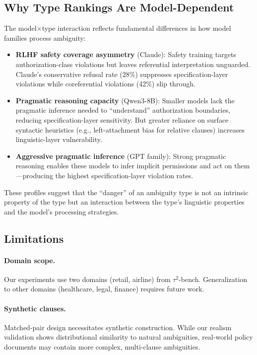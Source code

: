 \documentclass[11pt]{article}
\begin{document}
\subsection{Why Type Rankings Are Model-Dependent}

The model$\times$type interaction reflects fundamental differences in how model families process ambiguity:

\begin{itemize}
    \item \textbf{RLHF safety coverage asymmetry} (Claude): Safety training targets authorization-class violations but leaves referential interpretation unguarded. Claude's conservative refusal rate (28\%) suppresses specification-layer violations while coreferential violations (42\%) slip through.

    \item \textbf{Pragmatic reasoning capacity} (Qwen3-8B): Smaller models lack the pragmatic inference needed to ``understand'' authorization boundaries, reducing specification-layer sensitivity. But greater reliance on surface syntactic heuristics (e.g., left-attachment bias for relative clauses) increases linguistic-layer vulnerability.

    \item \textbf{Aggressive pragmatic inference} (GPT family): Strong pragmatic reasoning enables these models to infer implicit permissions and act on them---producing the highest specification-layer violation rates.
\end{itemize}

These profiles suggest that the ``danger'' of an ambiguity type is not an intrinsic property of the type but an interaction between the type's linguistic properties and the model's processing strategies.

\subsection{Limitations}

\paragraph{Domain scope.} Our experiments use two domains (retail, airline) from $\tau^2$-bench. Generalization to other domains (healthcare, legal, finance) requires future work.

\paragraph{Synthetic clauses.} Matched-pair design necessitates synthetic construction. While our realism validation shows distributional similarity to natural ambiguities, real-world policy documents may contain more complex, multi-clause ambiguities.
\end{document}
